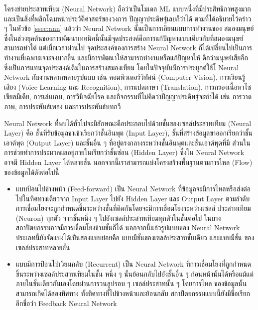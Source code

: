 โครงข่ายประสาทเทียม (Neural Network) ถือว่าเป็นโมเดล ML แบบหนึ่งที่มีประสิทธิภาพสูงมากและเป็นสิ่งที่พลิกโฉมหน้าประวัติศาสตร์ของวงการ%
ปัญญาประดิษฐ์เลยก็ว่าได้ ตามที่ได้อธิบายไว้คร่าว ๆ ในหัวข้อ \ref{ssec:ann} แล้วว่า Neural Network นั้นเป็นการเลียนแบบการทำงานของ%
สมองมนุษย์ ซึ่งในช่วงยุคต้นของการพัฒนาเทคนิคนี้นั้นมีจุดประสงค์คือการแก้ปัญหาแบบเดียวกับที่สมองมนุษย์สามารถทำได้ แต่เมื่อเวลาผ่านไป%
จุดประสงค์ของการสร้าง Neural Network ก็ได้เปลี่ยนไปเป็นการทำงานที่เฉพาะเจาะจงมากขึ้น และมีการพัฒนาให้สามารถทำงานหรือแก้ปัญหาให้%
ดีกว่ามนุษย์เสียอีก ซึ่งเป็นการแทนจุดประสงค์เดิมในการสร้างสมองเทียม โดยในปัจจุบันมีการประยุกต์ใช้โ Neural Network กับงานหลากหลายรูปแบบ
เช่น คอมพิวเตอร์วิทัศน์ (Computer Vision), การเรียนรู้เสียง (Voice Learning และ Recognition), การแปลภาษา (Translation),
การกรองเนื้อหาโซเชียลมีเดีย, การเล่นเกม, การวินิจฉัยโรค และกิจกรรมที่ไม่คิดว่าปัญญาประดิษฐ์จะทำได้ เช่น การวาดภาพ, การประพันธ์เพลง
และการประพันธ์บทกวี

Neural Network ที่พบได้ทั่วไปจะมีลักษณะคือประกอบไปด้วยชั้นของเซลล์ประสาทเทียม (Neural Layer) คือ ชั้นที่รับข้อมูลขาเข้าเรียกว่าชั้นอินพุต
(Input Layer), ชั้นที่สร้างข้อมูลขาออกเรียกว่าชั้นเอาต์พุต (Output Layer) และชั้นอื่น ๆ ที่อยู่ตรงกลางระหว่างชั้นอินพุตและชั้นเอาต์พุตที่มี%
ส่วนในการช่วยทำการประมวลผลอยู่ภายในเรียกว่าชั้นซ่อน (Hidden Layer) ซึ่งใน Neural Network อาจมี Hidden Layer ได้หลายชั้น
นอกจากนี้เราสามารถแบ่งโครงสร้างพื้นฐานตามการไหล (Flow) ของข้อมูลได้ดังต่อไปนี้

\begin{itemize}[topsep=0pt,noitemsep]\setlength\itemsep{0.5em}
    \item แบบป้อนไปข้างหน้า (Feed-forward) เป็น Neural Network ที่ข้อมูลจะมีการไหลหรือส่งต่อไปในทิศทางเดียวจาก Input Layer
          ไปยัง Hidden Layer และ Output Layer ตามลำดับ การเชื่อมโยงจะถูกกำหนดขึ้นระหว่างชั้นที่ติดกันโดยจะมีการเชื่อมโยงระหว่างเซลล์%
          ประสาทเทียม (Neuron) ทุกตัว จากชั้นหนึ่ง ๆ ไปยังเซลล์ประสาทเทียมทุกตัวในชั้นต่อไป ในบางสถาปัตยกรรมอาจมีการเชื่อมโยงข้ามชั้นก็ได้
          นอกจากนี้แล้วรูปแบบของ Neural Network ประเภทนี้ยังจัดแบ่งได้เป็นสองแบบย่อยคือ แบบมีชั้นของเซลล์ประสาทชั้นเดียว และแบบมีชั้น%
          ของเซลล์ประสาทหลายชั้น

    \item แบบมีการป้อนไปเวียนกลับ (Recurrent) เป็น Neural Network ที่การเชื่อมโยงที่ถูกกำหนดขึ้นระหว่างเซลล์ประสาทเทียมในชั้น%
          หนึ่ง ๆ นั้นย้อนกลับไปยังชั้นอื่น ๆ ก่อนหน้านั้นได้หรือแม้แต่ภายในชั้นเดียวกันเองโดยผ่านการวนลูปรอบ ๆ เซลล์ประสาทนั้น ๆ โดยการไหล%
          ของข้อมูลนั้นสามารถเกิดได้สองทิศทาง ทั้งทิศทางที่ไปข้างหน้าและย้อนกลับ สถาปัตยกรรมแบบนี้ยังมีชื่อเรียกอีกชื่อว่า Feedback Neural
          Network
\end{itemize}

